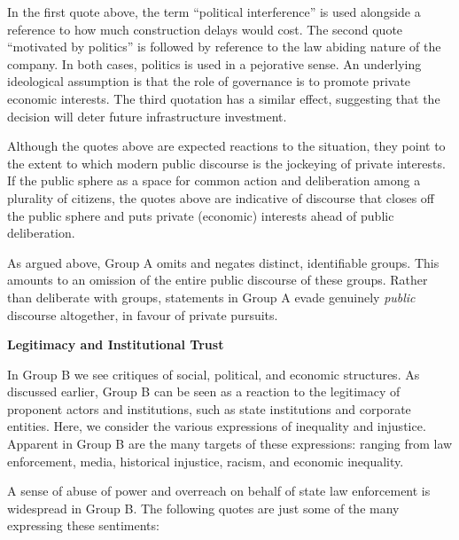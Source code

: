 In the first quote above, the term ``political interference'' is used alongside a reference to how much construction delays would cost. The second quote ``motivated by politics'' is followed by reference to the law abiding nature of the company. In both cases, politics is used in a pejorative sense. An underlying ideological assumption is that the role of governance is to promote private economic interests. The third quotation has a similar effect, suggesting that the decision will deter future infrastructure investment.  

Although the quotes above are expected reactions to the situation, they point to the extent to which modern public discourse is the jockeying of private interests. If the public sphere as a space for common action and deliberation among a plurality of citizens, the quotes above are indicative of discourse that closes off the public sphere and puts private (economic) interests ahead of public deliberation. 

As argued above, Group A omits and negates distinct, identifiable groups. This amounts to an omission of the entire public discourse of these groups. Rather than deliberate with groups, statements in Group A evade genuinely \textit{public} discourse altogether, in favour of private pursuits.   

\textbf{Legitimacy and Institutional Trust}

In Group B we see critiques of social, political, and economic structures. As discussed earlier, Group B can be seen as a reaction to the legitimacy of proponent actors and institutions, such as state institutions and corporate entities. Here, we consider the various expressions of inequality and injustice. Apparent in Group B are the many targets of these expressions: ranging from law enforcement, media, historical injustice, racism, and economic inequality.

A sense of abuse of power and overreach on behalf of state law enforcement is widespread in Group B. The following quotes are just some of the many expressing these sentiments:


